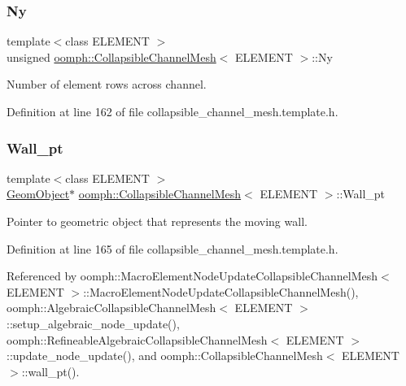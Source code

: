 \mbox{\label{classoomph_1_1CollapsibleChannelMesh_afa8d1dceef1cafeb166794d9275a30a3}} 
\subsubsection{\texorpdfstring{Ny}{Ny}}
{\footnotesize\ttfamily template$<$class E\+L\+E\+M\+E\+NT $>$ \\
unsigned \hyperlink{classoomph_1_1CollapsibleChannelMesh}{oomph\+::\+Collapsible\+Channel\+Mesh}$<$ E\+L\+E\+M\+E\+NT $>$\+::Ny\hspace{0.3cm}{\ttfamily [protected]}}



Number of element rows across channel. 



Definition at line 162 of file collapsible\+\_\+channel\+\_\+mesh.\+template.\+h.

\mbox{\label{classoomph_1_1CollapsibleChannelMesh_a2457ac1492c962b0a3d962b13b51ea6e}} 
\subsubsection{\texorpdfstring{Wall\+\_\+pt}{Wall\_pt}}
{\footnotesize\ttfamily template$<$class E\+L\+E\+M\+E\+NT $>$ \\
\hyperlink{classoomph_1_1GeomObject}{Geom\+Object}$\ast$ \hyperlink{classoomph_1_1CollapsibleChannelMesh}{oomph\+::\+Collapsible\+Channel\+Mesh}$<$ E\+L\+E\+M\+E\+NT $>$\+::Wall\+\_\+pt\hspace{0.3cm}{\ttfamily [protected]}}



Pointer to geometric object that represents the moving wall. 



Definition at line 165 of file collapsible\+\_\+channel\+\_\+mesh.\+template.\+h.



Referenced by oomph\+::\+Macro\+Element\+Node\+Update\+Collapsible\+Channel\+Mesh$<$ E\+L\+E\+M\+E\+N\+T $>$\+::\+Macro\+Element\+Node\+Update\+Collapsible\+Channel\+Mesh(), oomph\+::\+Algebraic\+Collapsible\+Channel\+Mesh$<$ E\+L\+E\+M\+E\+N\+T $>$\+::setup\+\_\+algebraic\+\_\+node\+\_\+update(), oomph\+::\+Refineable\+Algebraic\+Collapsible\+Channel\+Mesh$<$ E\+L\+E\+M\+E\+N\+T $>$\+::update\+\_\+node\+\_\+update(), and oomph\+::\+Collapsible\+Channel\+Mesh$<$ E\+L\+E\+M\+E\+N\+T $>$\+::wall\+\_\+pt().



